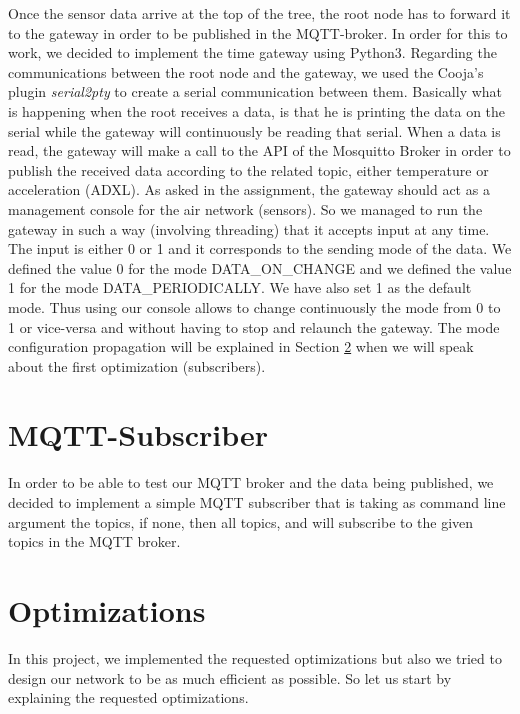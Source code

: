 \documentclass[a4paper,10pt]{article}
\begin{document}
Once the sensor data arrive at the top of the tree, the root node has to forward it to the gateway in order to be published in the MQTT-broker. In order for this to work, we decided to implement the time gateway using Python3. Regarding the communications between the root node and the gateway, we used the Cooja's plugin \emph{serial2pty} to create a serial communication between them. Basically what is happening when the root receives a data, is that he is printing the data on the serial while the gateway will continuously be reading that serial. When a data is read, the gateway will make a call to the API of the Mosquitto Broker in order to publish the received data according to the related topic, either temperature or acceleration (ADXL). As asked in the assignment, the gateway should act as a management console for the air network (sensors). So we managed to run the gateway in such a way (involving threading) that it accepts input at any time. The input is either 0 or 1 and it corresponds to the sending mode of the data. We defined the value 0 for the mode DATA\_ON\_CHANGE and we defined the value 1 for the mode DATA\_PERIODICALLY. We have also set 1 as the default mode. Thus using our console allows to change continuously the mode from 0 to 1 or vice-versa and without having to stop and relaunch the gateway. The mode configuration propagation will be explained in Section \ref{opti} when we will speak about the first optimization (subscribers).


\section{MQTT-Subscriber}
\label{subscriber}
In order to be able to test our MQTT broker and the data being published, we decided to implement a simple MQTT subscriber that is taking as command line argument the topics, if none, then all topics, and will subscribe to the given topics in the MQTT broker.


\section{Optimizations}
\label{opti}
In this project, we implemented the requested optimizations but also we tried to design our network to be as much efficient as possible.  So let us start by explaining the requested optimizations.
\end{document}
